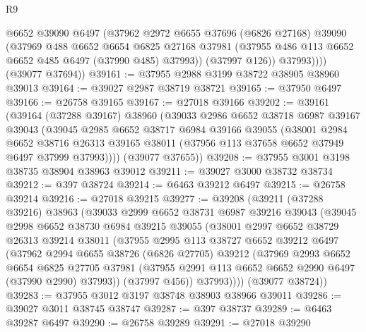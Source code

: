 \begin{lexlean}{R9}
\begin{coremodule}
              @6652
              @39090
              @6497
              (@37962
                @2972
                @6655
                @37696
                (@6826 @27168)
                @39090
                (@37969
                  @488
                  @6652
                  @6654
                  @6825
                  @27168
                  @37981
                  (@37955 @486 @113 @6652 @6652 @485 @6497 (@37990 @485) @37993))
                (@37997 @126))
              @37993))))
      (@39077 @37694))
@39161 := @37955 @2988 @3199 @38722 @38905 @38960 @39013
@39164 := @39027 @2987 @38719 @38721
@39165 := @37950 @6497
@39166 := @26758 @39165
@39167 := @27018 @39166
@39202 := @39161
    (@39164
      (@37288 @39167)
      @38960
      (@39033
        @2986
        @6652
        @38718
        @6987
        @39167
        @39043
        (@39045
          @2985
          @6652
          @38717
          @6984
          @39166
          @39055
          (@38001
            @2984
            @6652
            @38716
            @26313
            @39165
            @38011
            (@37956 @113 @37658 @6652 @37949 @6497 @37999 @37993))))
      (@39077 @37655))
@39208 := @37955 @3001 @3198 @38735 @38904 @38963 @39012
@39211 := @39027 @3000 @38732 @38734
@39212 := @397 @38724
@39214 := @6463 @39212 @6497
@39215 := @26758 @39214
@39216 := @27018 @39215
@39277 := @39208
    (@39211
      (@37288 @39216)
      @38963
      (@39033
        @2999
        @6652
        @38731
        @6987
        @39216
        @39043
        (@39045
          @2998
          @6652
          @38730
          @6984
          @39215
          @39055
          (@38001
            @2997
            @6652
            @38729
            @26313
            @39214
            @38011
            (@37955
              @2995
              @113
              @38727
              @6652
              @39212
              @6497
              (@37962
                @2994
                @6655
                @38726
                (@6826 @27705)
                @39212
                (@37969
                  @2993
                  @6652
                  @6654
                  @6825
                  @27705
                  @37981
                  (@37955 @2991 @113 @6652 @6652 @2990 @6497 (@37990 @2990) @37993))
                (@37997 @456))
              @37993))))
      (@39077 @38724))
@39283 := @37955 @3012 @3197 @38748 @38903 @38966 @39011
@39286 := @39027 @3011 @38745 @38747
@39287 := @397 @38737
@39289 := @6463 @39287 @6497
@39290 := @26758 @39289
@39291 := @27018 @39290

\end{coremodule}
\end{lexlean}
